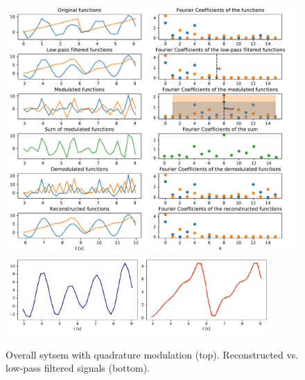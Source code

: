 \documentclass[12pt, a4paper]{report}
\begin{document}
\begin{figure}[h!]
	\centering
	\includegraphics[width=\textwidth]{figures/overall_quad.pdf}
	\includegraphics[width=0.9\textwidth]{figures/quad_cmp.pdf}
	\caption{Overall sytsem with quadrature modulation (top). Reconstructed vs. low-pass filtered signals (bottom).}
	\label{fig:quadrature}
\end{figure}
\end{document}
